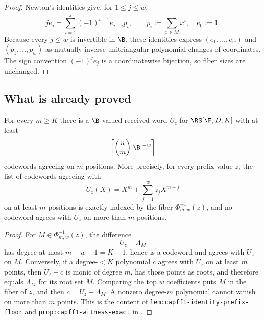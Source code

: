 \begin{proof}
Newton's identities give, for \(1\le j\le w\),
\[
        j e_j=\sum_{i=1}^{j}(-1)^{i-1}e_{j-i}p_i,
        \qquad p_i:=\sum_{x\in M}x^i,\quad e_0:=1.
\]
Because every \(j\le w\) is invertible in \(\B\), these identities express
\((e_1,\ldots,e_w)\) and \((p_1,\ldots,p_w)\) as mutually inverse
unitriangular polynomial changes of coordinates.  The sign convention
\((-1)^je_j\) is a coordinatewise bijection, so fiber sizes are unchanged.
\end{proof}

\subsection{What is already proved}

\begin{proposition}
\label{prop:q-prefix-floor-exact}
For every \(m\ge K\) there is a \(\B\)-valued received word \(U_z\) for
\(\RS[\F,D,K]\) with at least
\[
        \left\lceil \binom{n}{m}|\B|^{-w}\right\rceil
\]
codewords agreeing on \(m\) positions.  More precisely, for every prefix value
\(z\), the list of codewords agreeing with
\[
        U_z(X)=X^m+\sum_{j=1}^{w}z_jX^{m-j}
\]
on at least \(m\) positions is exactly indexed by the fiber
\(\Phi_{m,w}^{-1}(z)\), and no codeword agrees with \(U_z\) on more than \(m\)
positions.
\end{proposition}

\begin{proof}
For \(M\in\Phi_{m,w}^{-1}(z)\), the difference
\[
        U_z-\Lambda_M
\]
has degree at most \(m-w-1=K-1\), hence is a codeword and agrees with \(U_z\)
on \(M\).  Conversely, if a degree-\(<K\) polynomial \(c\) agrees with \(U_z\)
on at least \(m\) points, then \(U_z-c\) is monic of degree \(m\), has those
points as roots, and therefore equals \(\Lambda_M\) for its root set \(M\).
Comparing the top \(w\) coefficients puts \(M\) in the fiber of \(z\), and
then \(c=U_z-\Lambda_M\).  A nonzero degree-\(m\) polynomial cannot vanish on
more than \(m\) points.  This is the content of
\texttt{lem:capff1-identity-prefix-floor} and
\texttt{prop:capff1-witness-exact} in \cite{CAP25v13}.
\end{proof}

